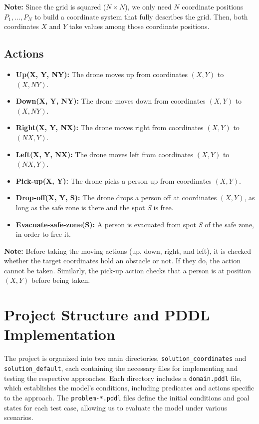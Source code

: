 \documentclass{article}
\begin{document}
\textbf{Note:} Since the grid is squared (\(N \times N\)), we only need \(N\) coordinate positions \(P_1, \ldots, P_N\) to build a coordinate system that fully describes the grid. Then, both coordinates \(X\) and \(Y\) take values among those coordinate positions.

\subsection{Actions}

\begin{itemize}[label=--, itemsep=0.05em]
    \item \textbf{Up(X, Y, NY):} The drone moves up from coordinates \((X, Y)\) to \((X, NY)\).
    \item \textbf{Down(X, Y, NY):} The drone moves down from coordinates \((X, Y)\) to \((X, NY)\).
    \item \textbf{Right(X, Y, NX):} The drone moves right from coordinates \((X, Y)\) to \((NX, Y)\).
    \item \textbf{Left(X, Y, NX):} The drone moves left from coordinates \((X, Y)\) to \((NX, Y)\).
    \item \textbf{Pick-up(X, Y):} The drone picks a person up from coordinates \((X, Y)\).
    \item \textbf{Drop-off(X, Y, S):} The drone drops a person off at coordinates \((X, Y)\), as long as the safe zone is there and the spot \textit{S} is free.
    \item \textbf{Evacuate-safe-zone(S):} A person is evacuated from spot \textit{S} of the safe zone, in order to free it.
\end{itemize}

\textbf{Note:} Before taking the moving actions (up, down, right, and left), it is checked whether the target coordinates hold an obstacle or not. If they do, the action cannot be taken. Similarly, the pick-up action checks that a person is at position \((X, Y)\) before being taken.

\section{Project Structure and PDDL Implementation}

The project is organized into two main directories, \texttt{solution\_coordinates} and \texttt{solution\_default}, each containing the necessary files for implementing and testing the respective approaches. Each directory includes a \texttt{domain.pddl} file, which establishes the model's conditions, including predicates and actions specific to the approach. The \texttt{problem-*.pddl} files define the initial conditions and goal states for each test case, allowing us to evaluate the model under various scenarios.
\end{document}
